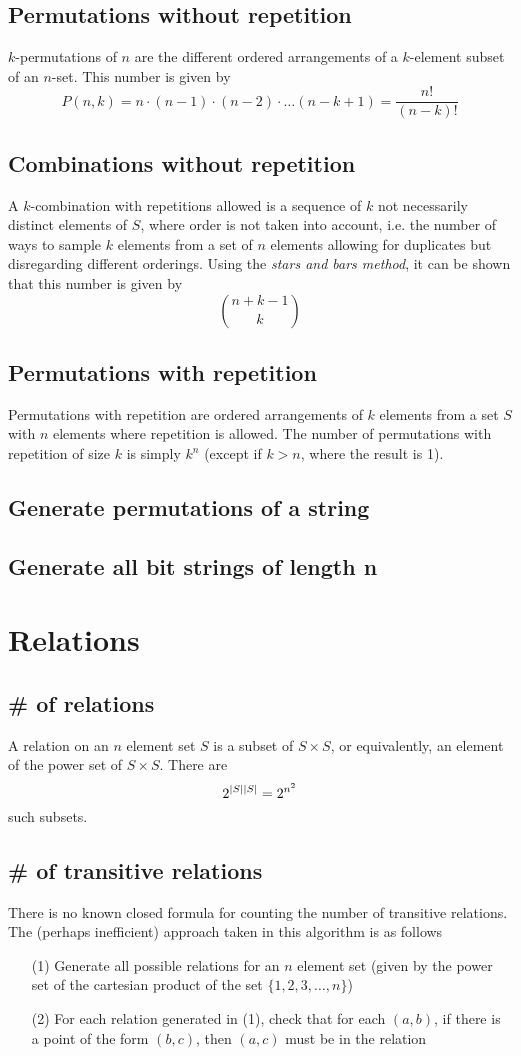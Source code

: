 \documentclass{article}
\begin{document}
\subsection{Permutations without repetition}
$k$-permutations of $n$ are the different ordered arrangements of a $k$-element subset of an $n$-set. This number is given by
\[P(n,k) = n \cdot (n-1) \cdot (n-2) \cdot \dots (n-k+1) = \frac{n!}{(n-k)!}\]
\subsection{Combinations without repetition}
A $k$-combination with repetitions allowed is a sequence of $k$ not necessarily distinct elements of $S$, where order is not taken into account, i.e. the number of ways to sample $k$ elements from a set of $n$ elements allowing for duplicates but disregarding different orderings. Using the \emph{stars and bars method}, it can be shown that this number is given by
\[{n+k-1 \choose k}\]

\subsection{Permutations with repetition}
Permutations with repetition are ordered arrangements of $k$ elements from a set $S$ with $n$ elements where repetition is allowed. The number of permutations with repetition of size $k$ is simply $k^n$ (except if $k > n$, where the result is 1).
\subsection{Generate permutations of a string}
\subsection{Generate all bit strings of length n}

\section{Relations}
\subsection{\# of relations}
A relation on an $n$ element set $S$ is a subset of $S \times S$, or equivalently, an element of the power set of $S \times S$. There are
\[2^{\,\abs{S}\,\abs{S}}=2^{n^2}\]
such subsets.
\subsection{\# of transitive relations}
There is no known closed formula for counting the number of transitive relations. The (perhaps inefficient) approach taken in this algorithm is as follows
\begin{enumerate}
\item[(1)] Generate all possible relations for an $n$ element set (given by the power set of the cartesian product of the set $\{1,2,3,\dots,n\}$)
\item[(2)] For each relation generated in (1), check that for each $(a,b)$, if there is a point of the form $(b,c)$, then $(a,c)$ must be in the relation
\end{enumerate}
\end{document}
